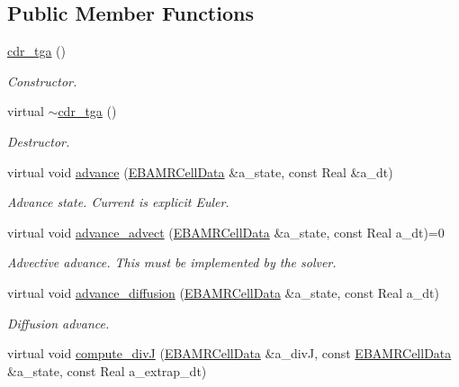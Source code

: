 \subsection*{Public Member Functions}
\begin{DoxyCompactItemize}
\item 
\hyperlink{classcdr__tga_a8b5a112f27837814e53e86b43e3c4917}{cdr\+\_\+tga} ()
\begin{DoxyCompactList}\small\item\em Constructor. \end{DoxyCompactList}\item 
virtual \hyperlink{classcdr__tga_a559e1488d847181c0476708848252f92}{$\sim$cdr\+\_\+tga} ()
\begin{DoxyCompactList}\small\item\em Destructor. \end{DoxyCompactList}\item 
virtual void \hyperlink{classcdr__tga_a143e4540bb16d7668fad3d50751e967f}{advance} (\hyperlink{type__definitions_8H_a7e610f301989e5e07781c5e338bdb7c3}{E\+B\+A\+M\+R\+Cell\+Data} \&a\+\_\+state, const Real \&a\+\_\+dt)
\begin{DoxyCompactList}\small\item\em Advance state. Current is explicit Euler. \end{DoxyCompactList}\item 
virtual void \hyperlink{classcdr__tga_a64e21561268b7a89d648fd8baaf96eea}{advance\+\_\+advect} (\hyperlink{type__definitions_8H_a7e610f301989e5e07781c5e338bdb7c3}{E\+B\+A\+M\+R\+Cell\+Data} \&a\+\_\+state, const Real a\+\_\+dt)=0
\begin{DoxyCompactList}\small\item\em Advective advance. This must be implemented by the solver. \end{DoxyCompactList}\item 
virtual void \hyperlink{classcdr__tga_a1a4f76f0a57bbdc2a97fccd6712b0641}{advance\+\_\+diffusion} (\hyperlink{type__definitions_8H_a7e610f301989e5e07781c5e338bdb7c3}{E\+B\+A\+M\+R\+Cell\+Data} \&a\+\_\+state, const Real a\+\_\+dt)
\begin{DoxyCompactList}\small\item\em Diffusion advance. \end{DoxyCompactList}\item 
virtual void \hyperlink{classcdr__tga_a4ac0312ac22e49706e620b671415feba}{compute\+\_\+divJ} (\hyperlink{type__definitions_8H_a7e610f301989e5e07781c5e338bdb7c3}{E\+B\+A\+M\+R\+Cell\+Data} \&a\+\_\+divJ, const \hyperlink{type__definitions_8H_a7e610f301989e5e07781c5e338bdb7c3}{E\+B\+A\+M\+R\+Cell\+Data} \&a\+\_\+state, const Real a\+\_\+extrap\+\_\+dt)

\end{DoxyCompactItemize}
